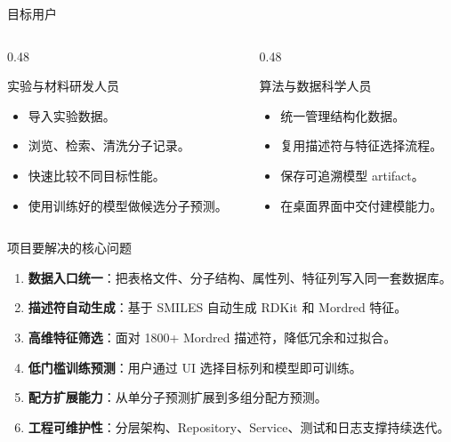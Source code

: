 \documentclass[aspectratio=169,11pt]{beamer}
\newcommand{\kw}[1]{\textcolor{ChemBlue}{\textbf{#1}}}
\newenvironment{templatebox}[1]{%
  \begin{beamerboxesrounded}[upper=block title,lower=block body,shadow=false]{#1}%
  \small
}{%
  \end{beamerboxesrounded}%
}
\begin{document}
\begin{frame}{目标用户}
  \begin{columns}
    \begin{column}{0.48\textwidth}
      \begin{templatebox}{实验与材料研发人员}
        \begin{itemize}
          \item 导入实验数据。
          \item 浏览、检索、清洗分子记录。
          \item 快速比较不同目标性能。
          \item 使用训练好的模型做候选分子预测。
        \end{itemize}
      \end{templatebox}
    \end{column}
    \begin{column}{0.48\textwidth}
      \begin{templatebox}{算法与数据科学人员}
        \begin{itemize}
          \item 统一管理结构化数据。
          \item 复用描述符与特征选择流程。
          \item 保存可追溯模型 artifact。
          \item 在桌面界面中交付建模能力。
        \end{itemize}
      \end{templatebox}
    \end{column}
  \end{columns}
\end{frame}

\begin{frame}{项目要解决的核心问题}
  \begin{enumerate}
    \item \kw{数据入口统一}：把表格文件、分子结构、属性列、特征列写入同一套数据库。
    \item \kw{描述符自动生成}：基于 SMILES 自动生成 RDKit 和 Mordred 特征。
    \item \kw{高维特征筛选}：面对 1800+ Mordred 描述符，降低冗余和过拟合。
    \item \kw{低门槛训练预测}：用户通过 UI 选择目标列和模型即可训练。
    \item \kw{配方扩展能力}：从单分子预测扩展到多组分配方预测。
    \item \kw{工程可维护性}：分层架构、Repository、Service、测试和日志支撑持续迭代。
  \end{enumerate}
\end{frame}
\end{document}
